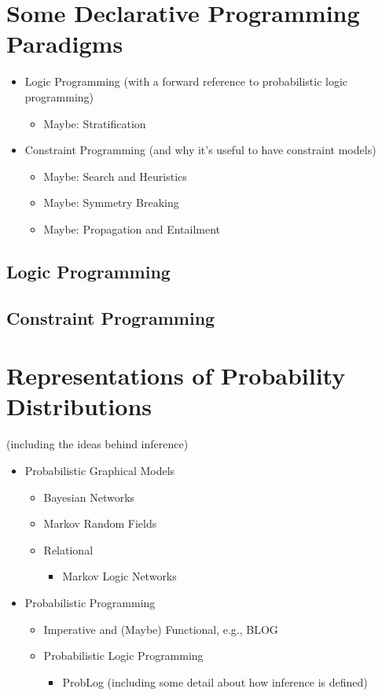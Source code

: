 \section{Some Declarative Programming Paradigms}

\begin{itemize}
\item Logic Programming (with a forward reference to probabilistic logic programming)
  \begin{itemize}
  \item Maybe: Stratification
  \end{itemize}
\item Constraint Programming (and why it's useful to have constraint models)
  \begin{itemize}
  \item Maybe: Search and Heuristics
  \item Maybe: Symmetry Breaking
  \item Maybe: Propagation and Entailment
  \end{itemize}
\end{itemize}

\subsection{Logic Programming}

\subsection{Constraint Programming} \label{sec:cp}

\section{Representations of Probability Distributions}

(including the ideas behind inference)
\begin{itemize}
\item Probabilistic Graphical Models
  \begin{itemize}
  \item Bayesian Networks
  \item Markov Random Fields
  \item Relational
    \begin{itemize}
    \item Markov Logic Networks
    \end{itemize}
  \end{itemize}
\item Probabilistic Programming
  \begin{itemize}
  \item Imperative and (Maybe) Functional, e.g., BLOG
  \item Probabilistic Logic Programming
    \begin{itemize}
    \item ProbLog (including some detail about how inference is defined)
    \end{itemize}
  \end{itemize}
\end{itemize}

